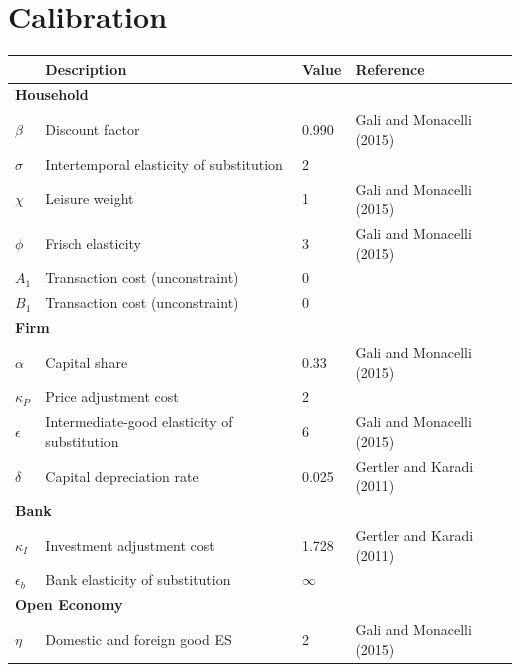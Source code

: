 \documentclass[12pt]{article}
\begin{document}
\clearpage
\section{Calibration}

\begin{table}[h!]
\centering
\begin{tabular}{llll}
\hline\hline
 & Description & Value & Reference \\ \hline
\multicolumn{4}{l}{\bf Household}     \\
$\beta$    & Discount factor       & 0.990  & Gali and Monacelli (2015)              					 \\
$\sigma$     & Intertemporal elasticity of substitution     & 2      \\
$\chi$       & Leisure weight     & 1  & Gali and Monacelli (2015)                                    \\
$\phi$        & Frisch elasticity      & 3     & Gali and Monacelli (2015)                                 \\
$A_1$      & Transaction cost (unconstraint)   & 0              	     \\
$B_1$     & Transaction cost (unconstraint)   & 0                   	 \\
\multicolumn{4}{l}{\bf Firm}     \\
$\alpha$     & Capital share    & 0.33     &   Gali and Monacelli (2015)                       			\\
$\kappa_P$     & Price adjustment cost   & 2                                                      \\
$\epsilon$       & Intermediate-good elasticity of substitution  & 6  &   Gali and Monacelli (2015)       \\
$\delta$       & Capital depreciation rate        & 0.025   & Gertler and Karadi (2011)                                             \\
\multicolumn{4}{l}{\bf Bank}     \\
$\kappa_I$         & Investment adjustment cost        & 1.728       & Gertler and Karadi (2011)                            \\
$\epsilon_b$      & Bank elasticity of substitution    & $\infty$                                     \\
\multicolumn{4}{l}{\bf Open Economy}     \\     
$\eta$      & Domestic and foreign good ES     & 2   &   Gali and Monacelli (2015)                    \\

\end{tabular}
\end{table}
\end{document}

